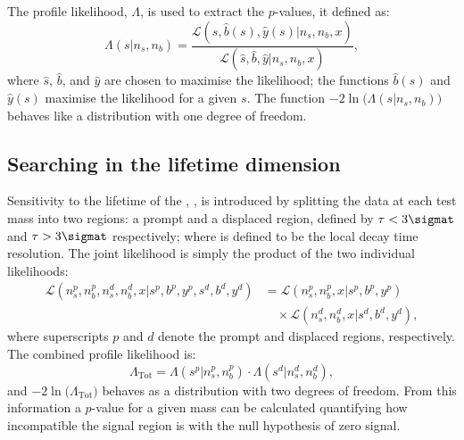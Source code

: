
The profile likelihood, $\Lambda$, is used to extract the $p$-values, it defined as:
\begin{equation}
  \Lambda(s|n_s,n_b) =
  \frac
  {\mathcal{L}(s, \hat{b}(s), \hat{y}(s) | n_s, n_b, x)}
  {\mathcal{L}(\hat{s}, \hat{b}, \hat{y} | n_s, n_b, x)},
  \label{eq:profilelike1}
\end{equation}
where $\hat{s}$, $\hat{b}$, and $\hat{y}$ are chosen to maximise the likelihood; the functions
$\hat{b}(s)$ and $\hat{y}(s)$ maximise the likelihood for a given $s$.
The function $-2\ln\big(\Lambda(s|n_s,n_b)\big)$ behaves like a \chisq distribution with one degree
of freedom.


\subsection{Searching in the lifetime dimension}
Sensitivity to the lifetime of the \db, \lifetime{\db}, is introduced by splitting the data at each
test mass into two regions: a prompt and a displaced region, defined by $\tau<3\sigmat$ and
$\tau>3\sigmat$ respectively; where \sigmat is defined to be the local decay time resolution.
The joint likelihood is simply the product of the two individual likelihoods:
\begin{align}
  \mathcal{L}(n^p_s, n^p_b, n^d_s, n^d_b, x | s^p, b^p, y^p, s^d, b^d, y^d) &=
  \mathcal{L}(n^p_s, n^p_b, x | s^p, b^p, y^p)\nonumber\\
  &\quad\times\mathcal{L}(n^d_s, n^d_b, x | s^d, b^d, y^d),
  \label{eq:db:liketau}
\end{align}
where superscripts $p$ and $d$ denote the prompt and displaced regions,
respectively.
The combined profile likelihood is:
\begin{equation}
  \Lambda_\mathrm{Tot}
  =
  \Lambda(s^p|n_s^p,n_b^p)\cdot
  \Lambda(s^d|n_s^d,n_b^d),
\end{equation}
and $-2\ln\big(\Lambda_\mathrm{Tot}\big)$ behaves as a \chisq distribution with two
degrees of freedom.
From this information a $p$-value for a given mass can be calculated
quantifying how incompatible the signal region is with the null
hypothesis of zero signal.

